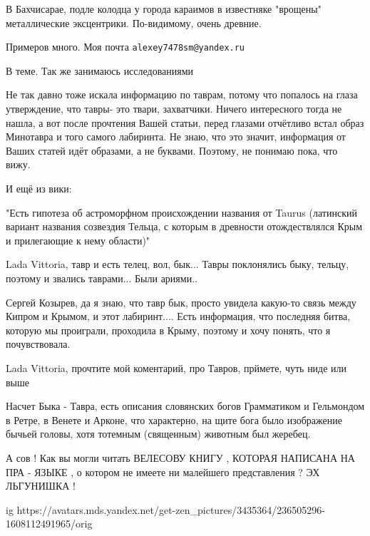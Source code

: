 \begin{itemize}
В Бахчисарае, подле колодца у города караимов в известняке "врощены"
металлические эксцентрики. По-видимому, очень древние.

Примеров много. Моя почта \verb|alexey7478sm@yandex.ru|

В теме. Так же занимаюсь исследованиями


Не так давно тоже искала информацию по таврам, потому что попалось на глаза
утверждение, что тавры- это твари, захватчики. Ничего интересного тогда не
нашла, а вот после прочтения Вашей статьи, перед глазами отчётливо встал образ
Минотавра и того самого лабиринта. Не знаю, что это значит, информация от Ваших
статей идёт образами, а не буквами. Поэтому, не понимаю пока, что вижу.

И ещё из вики:

"Есть гипотеза об астроморфном происхождении названия от Taurus (латинский
вариант названия созвездия Тельца, с которым в древности отождествлялся Крым и
прилегающие к нему области)"


Lada Vittoria, тавр и есть телец, вол, бык... Тавры поклонялись быку, тельцу,
поэтому и звались таврами... Были ариями..


Сергей Козырев, да я знаю, что тавр бык, просто увидела какую-то связь между
Кипром и Крымом, и этот лабиринт.... Есть информация, что последняя битва,
которую мы проиграли, проходила в Крыму, поэтому и хочу понять, что я
почувствовала.


Lada Vittoria, прочтите мой коментарий, про Тавров, прймете, чуть ниде или выше


Насчет Быка - Тавра, есть описания словянских богов Грамматиком и Гельмондом в
Ретре, в Венете и Арконе, что характерно, на щите бога было изображение бычьей
головы, хотя тотемным (священным) животным был жеребец.


А сов ! Как вы могли читать ВЕЛЕСОВУ КНИГУ , КОТОРАЯ НАПИСАНА НА ПРА - ЯЗЫКЕ ,
о котором не имеете ни малейшего представления ? ЭХ ЛЬГУНИШКА !


\ifcmt
  ig https://avatars.mds.yandex.net/get-zen_pictures/3435364/236505296-1608112491965/orig
\fi


\end{itemize}
